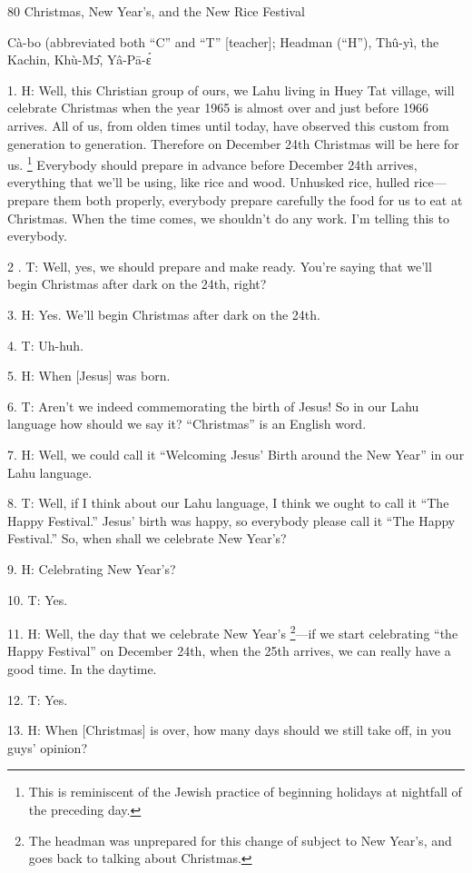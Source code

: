 
80 Christmas, New Year's, and the New Rice Festival

Cà-bo (abbreviated both ``C'' and ``T'' [teacher]; Headman (``H''), Thû-yì,
the Kachin, Khù-Mɔ̂, Yâ-Pā-ɛ́

1. H: Well, this Christian group of ours, we Lahu living in Huey Tat village, will
celebrate Christmas when the year 1965 is almost over and just before 1966 arrives.
All of us, from olden times until today, have observed this custom from generation
to generation.  Therefore on December 24th Christmas will be here for us. \footnote{This is reminiscent of the Jewish practice of beginning holidays at nightfall of the preceding day.} Everybody
should prepare in advance before December 24th arrives, everything that we'll be
using, like rice and wood.  Unhusked rice, hulled rice---prepare them both properly,
everybody prepare carefully the food for us to eat at Christmas.  When the time
comes, we shouldn't do any work.  I'm telling this to everybody.

2 . T: Well, yes, we should prepare and make ready.  You're saying that we'll begin
Christmas after dark on the 24th, right?

3. H: Yes.  We'll begin Christmas after dark on the 24th.

4. T: Uh-huh.

5. H: When [Jesus] was born.

6. T: Aren't we indeed commemorating the birth of Jesus!  So in our Lahu language
how should we say it?  ``Christmas'' is an English word.

7. H: Well, we could call it ``Welcoming Jesus' Birth around the New Year'' in
our Lahu language.

8. T: Well, if I think about our Lahu language, I think we ought to call it ``The
Happy Festival.''  Jesus' birth was happy, so everybody please call it ``The Happy
Festival.''  So, when shall we celebrate New Year's?

9. H: Celebrating New Year's?

10. T: Yes.

11. H: Well, the day that we celebrate New Year's \footnote{The headman was unprepared for this change of subject to New Year's, and goes back to talking about Christmas.}---if we start celebrating
``the Happy Festival'' on December 24th, when the 25th arrives, we can really have
a good time.  In the daytime.

12. T: Yes.

13. H: When [Christmas] is over, how many days should we still take off, in you
guys' opinion?

